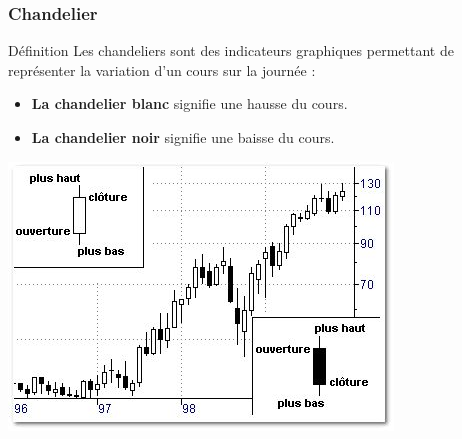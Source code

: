 \begin{frame}
    \frametitle{Chandelier}
    	\begin{block}{Définition}
  		Les chandeliers sont des indicateurs graphiques permettant de représenter la variation d'un cours sur la journée :
  		\begin{itemize}
  			\item \textbf{La chandelier blanc} signifie une hausse du cours.
  			\item \textbf{La chandelier noir} signifie une baisse du cours.
  		\end{itemize}
  		\center
  	\includegraphics[scale=0.3]{images/chandelier.png}
	\end{block}

\end{frame}

